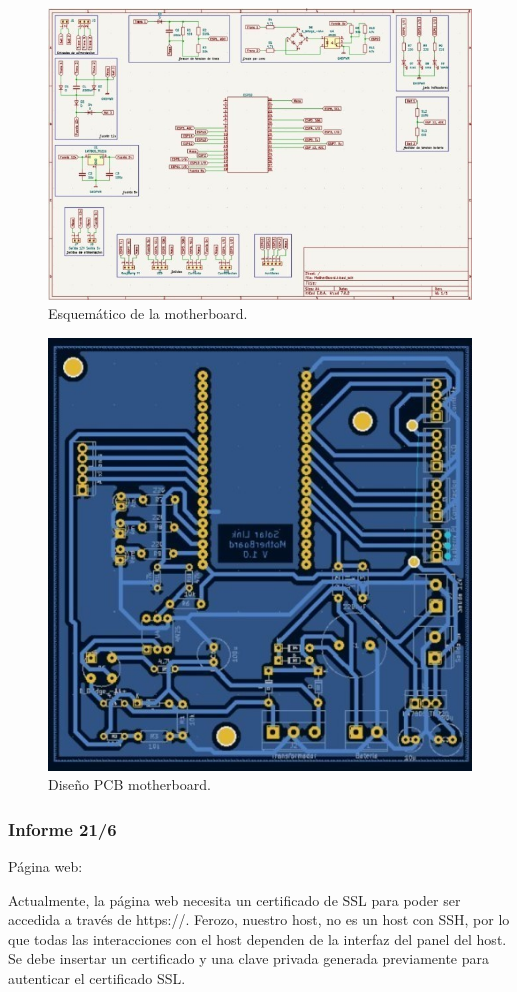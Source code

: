 \begin{figure}[H]
    \centering
    \includegraphics[width=0.75\linewidth]{informes/Screenshot_13.jpg}
    \caption{Esquemático de la motherboard.}
    
\end{figure}

\begin{figure}[H]
    \centering
    \includegraphics[width=0.75\linewidth]{informes/Screenshot_14.jpg}
    \caption{Diseño PCB motherboard.}
\end{figure}

\subsubsection{Informe 21/6}

Página web:

Actualmente, la página web necesita  un certificado de SSL para poder ser accedida a través de https://. Ferozo, nuestro host, no es un host con SSH, por lo que todas las interacciones con el host dependen de la interfaz del panel del host. Se debe insertar un certificado y una clave privada generada previamente para autenticar el certificado SSL.\\

